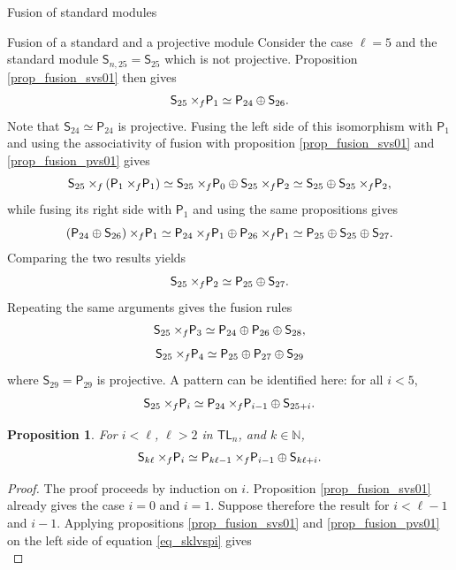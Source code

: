 \documentclass[reqno]{amsart}
\newtheorem{Prop}[Thm]{Proposition}
\newcommand{\tl}[1]{\mathsf{TL}_{#1}}
\newcommand{\ds}[1]{\mathsf S_{#1}}
\newcommand{\dP}[1]{\mathsf P_{#1}}
\newcommand{\xf}{\times\hspace{-0.27em}_f}
\newcommand{\lc}{\ell}
\begin{document}
\begin{section}{Fusion of standard modules}
\begin{subsection}{Fusion of a standard and a projective module}
Consider the case $\lc=5$ and the standard module $\ds{n,25} = \ds{25}$ which is not projective. Proposition \ref{prop_fusion_svs01} then gives 
\begin{equation}\label{eq_s25vsp1}
\ds{25}\xf\dP{1} \simeq \dP{24} \oplus \ds{26} \text{.}
\end{equation}
 Note that $\ds{24}\simeq\dP{24}$ is projective. Fusing the left side of this isomorphism with $\dP{1}$ and using the associativity of fusion with proposition \ref{prop_fusion_svs01} and \ref{prop_fusion_pvs01} gives
 \begin{equation}
 	\ds{25} \xf \left(\dP{1}\xf \dP{1}\right)  \simeq \ds{25} \xf \dP{0} \oplus \ds{25} \xf \dP{2} \simeq \ds{25} \oplus \ds{25} \xf \dP{2},
 \end{equation}
 while fusing its right side with $\dP{1}$ and using the same propositions gives
 \begin{equation}
 	\left(\dP{24} \oplus \ds{26} \right)\xf \dP{1} \simeq \dP{24} \xf \dP{1} \oplus \dP{26} \xf \dP{1} \simeq \dP{25} \oplus \ds{25} \oplus \ds{27}.
 \end{equation}
 Comparing the two results yields $$\ds{25} \xf \dP{2} \simeq \dP{25} \oplus \ds{27} \text{.}$$ Repeating the same arguments gives the fusion rules
\begin{equation}
\ds{25} \xf \dP{3} \simeq \dP{24} \oplus \dP{26} \oplus \ds{28},
\end{equation}
\begin{equation}\label{eq_s25vsp4}
\ds{25} \xf \dP{4} \simeq  \dP{25} \oplus \dP{27} \oplus \ds{29}
\end{equation}
where $\ds{29}=\dP{29}$ is projective. A pattern can be identified here: for all $i<5$, $$ \ds{25} \xf \dP{i} \simeq \dP{24} \xf \dP{i-1} \oplus \ds{25+i} \text{.}$$
\begin{Prop}\label{prop_fusion_sklvspi}
For $i < \lc$, $\lc>2$ in $\tl{n}$, and $k \in \mathbb{N}$,
\begin{equation}\label{eq_sklvspi}
\ds{k \lc} \xf \dP{i} \simeq \dP{k \lc -1}\xf \dP{i-1} \oplus \ds{ k \lc +i} \text{.}
\end{equation}
\end{Prop}
\begin{proof}
The proof proceeds by induction on $i$. Proposition \ref{prop_fusion_svs01} already gives the case $i=0$ and $i=1$. Suppose therefore the result for $i<\lc-1$ and $i-1$. Applying propositions \ref{prop_fusion_svs01} and \ref{prop_fusion_pvs01} on the left side of equation \eqref{eq_sklvspi} gives
\begin{equation}

\end{equation}
\end{proof}
\end{subsection}
\end{section}
\end{document}
